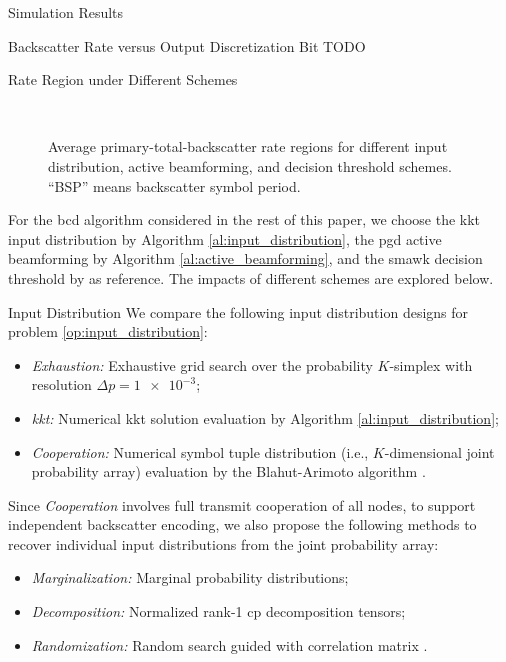 \documentclass[journal]{IEEEtran}
\begin{document}
\begin{section}{Simulation Results}
\begin{subsection}{Backscatter Rate versus Output Discretization Bit}
		TODO


	\end{subsection}

	\begin{subsection}{Rate Region under Different Schemes}
		\begin{figure}[!t]
			\centering
			\\
			\caption{
				Average primary-total-backscatter rate regions for different input distribution, active beamforming, and decision threshold schemes.
				``BSP'' means backscatter symbol period.
			}
		\end{figure}
		For the \gls{bcd} algorithm considered in the rest of this paper, we choose the \gls{kkt} input distribution by Algorithm \ref{al:input_distribution}, the \gls{pgd} active beamforming by Algorithm \ref{al:active_beamforming}, and the \gls{smawk} decision threshold by \cite{He2021} as reference.
		The impacts of different schemes are explored below.

		\begin{subsubsection}{Input Distribution}
			We compare the following input distribution designs for problem \eqref{op:input_distribution}:
			\begin{itemize}
				\item \emph{Exhaustion:} Exhaustive grid search over the probability $K$-simplex with resolution $\Delta p = \num{1e-3}$;
				\item \emph{\gls{kkt}:} Numerical \gls{kkt} solution evaluation by Algorithm \ref{al:input_distribution};
				\item \emph{Cooperation:} Numerical symbol tuple distribution (i.e., $K$-dimensional joint probability array) evaluation by the Blahut-Arimoto algorithm \cite{Arimoto1972,Blahut1972a}.
			\end{itemize}

			Since \emph{Cooperation} involves full transmit cooperation of all nodes, to support independent backscatter encoding, we also propose the following methods to recover individual input distributions from the joint probability array:
			\begin{itemize}
				\item \emph{Marginalization:} Marginal probability distributions;
				\item \emph{Decomposition:} Normalized rank-\num{1} \gls{cp} decomposition tensors;
				\item \emph{Randomization:} Random search guided with correlation matrix \cite{Calvo2010}.
			\end{itemize}


\end{subsubsection}
\end{subsection}
\end{section}
\end{document}
